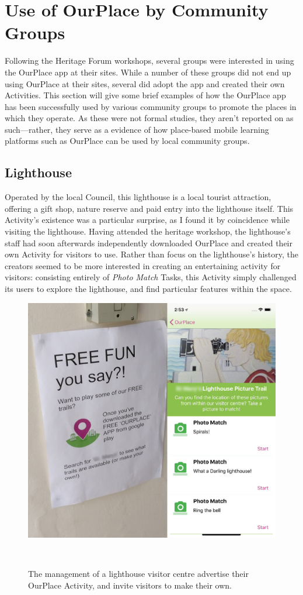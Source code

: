 \section{Use of OurPlace by Community Groups}
\label{sec:CommunityGroups}

Following the Heritage Forum workshops, several groups were interested in using the OurPlace app at their sites. While a number of these groups did not end up using OurPlace at their sites, several did adopt the app and created their own Activities. This section will give some brief examples of how the OurPlace app has been successfully used by various community groups to promote the places in which they operate. As these were not formal studies, they aren't reported on as such---rather, they serve as a evidence of how place-based mobile learning platforms such as OurPlace can be used by local community groups.

\subsection{Lighthouse}

Operated by the local Council, this lighthouse is a local tourist attraction, offering a gift shop, nature reserve and paid entry into the lighthouse itself. This Activity's existence was a particular surprise, as I found it by coincidence while visiting the lighthouse. Having attended the heritage workshop, the lighthouse's staff had soon afterwards independently downloaded OurPlace and created their own Activity for visitors to use. Rather than focus on the lighthouse's history, the creators seemed to be more interested in creating an entertaining activity for visitors: consisting entirely of \textit{Photo Match} Tasks, this Activity simply challenged its users to explore the lighthouse, and find particular features within the space.

\begin{figure}
  \centering
  \includegraphics[width=0.65\columnwidth]{images/chapter06/OurPlaceLighthouse.jpg}
  \caption[An OurPlace Activity at a lighthouse]{The management of a lighthouse visitor centre advertise their OurPlace Activity, and invite visitors to make their own.}~\label{fig:OurPlaceLighthouse}
\end{figure}

